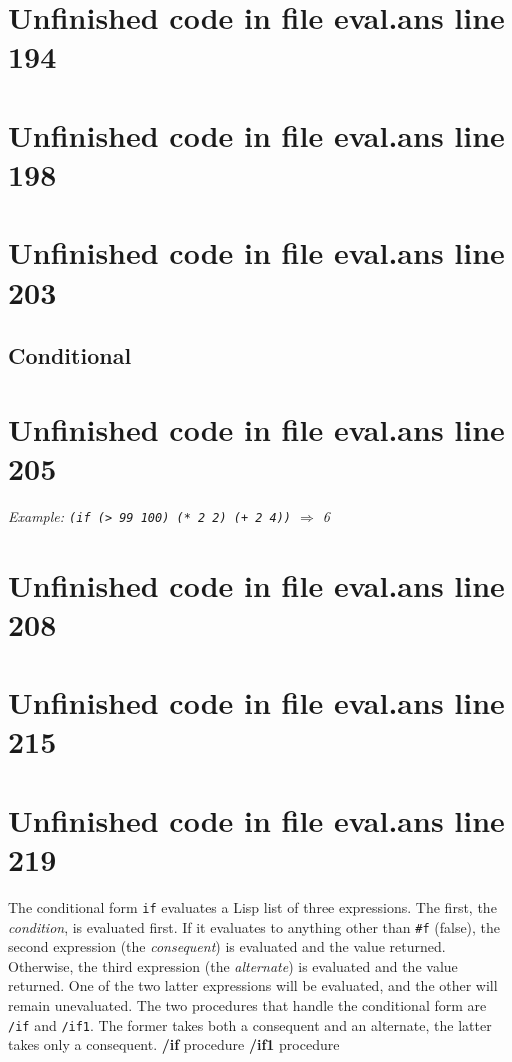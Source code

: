 \documentclass[twoside,9pt]{report}
\begin{document}
\section{Unfinished code in file eval.ans line 194}
\section{Unfinished code in file eval.ans line 198}
\section{Unfinished code in file eval.ans line 203}
\subsection{Conditional}
\label{conditional}
\section{Unfinished code in file eval.ans line 205}


\emph{Example: \texttt{(if (> 99 100) (* 2 2) (+ 2 4))} $\Rightarrow$ 6}

\section{Unfinished code in file eval.ans line 208}
\section{Unfinished code in file eval.ans line 215}
\section{Unfinished code in file eval.ans line 219}

The conditional form \texttt{if} evaluates a Lisp list of three expressions. The first, the \emph{condition}, is evaluated first. If it evaluates to anything other than \texttt{\#f} (false), the second expression (the \emph{consequent}) is evaluated and the value returned. Otherwise, the third expression (the \emph{alternate}) is evaluated and the value returned. One of the two latter expressions will be evaluated, and the other will remain unevaluated. The two procedures that handle the conditional form are \texttt{/if} and \texttt{/if1}. The former takes both a consequent and an alternate, the latter takes only a consequent. \textbf{/if} procedure \textbf{/if1} procedure
\end{document}
